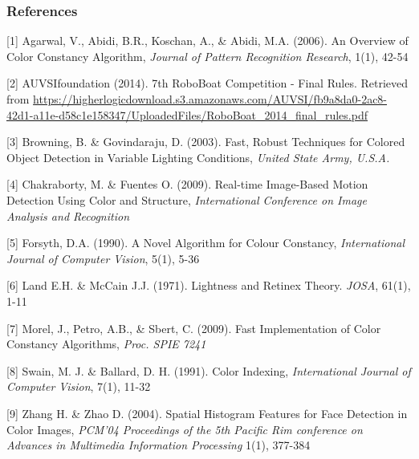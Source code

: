 \documentclass{article} %
\begin{document}
\subsubsection*{References}



\small{

[1]  Agarwal, V., Abidi, B.R., Koschan, A., \& Abidi, M.A. (2006). An Overview of Color Constancy Algorithm, {\it Journal of Pattern Recognition Research}, 1(1), 42-54

[2] AUVSIfoundation (2014). 7th RoboBoat Competition - Final Rules. Retrieved from
\url{https://higherlogicdownload.s3.amazonaws.com/AUVSI/fb9a8da0-2ac8-42d1-a11e-d58c1e158347/UploadedFiles/RoboBoat_2014_final_rules.pdf}

[3] Browning, B. \& Govindaraju, D. (2003). Fast, Robust Techniques for Colored Object Detection in Variable Lighting Conditions, {\it United State Army, U.S.A.}

[4] Chakraborty, M. \& Fuentes O. (2009). Real-time Image-Based Motion Detection Using Color and Structure, {\it International Conference on Image Analysis and Recognition}

[5] Forsyth, D.A. (1990). A Novel Algorithm for Colour Constancy, {\it International Journal of Computer Vision}, 5(1), 5-36

[6] Land E.H. \& McCain J.J. (1971). Lightness and Retinex Theory. {\it JOSA}, 61(1), 1-11

[7] Morel, J., Petro, A.B., \& Sbert, C. (2009). Fast Implementation of Color Constancy Algorithms, {\it Proc. SPIE 7241}

[8] Swain, M. J. \& Ballard, D. H. (1991). Color Indexing, {\it International Journal of Computer Vision}, 7(1), 11-32

[9] Zhang H. \& Zhao D. (2004). Spatial Histogram Features for Face Detection in Color Images, {\it PCM'04 Proceedings of the 5th Pacific Rim conference on Advances in Multimedia Information Processing} 1(1), 377-384 



}
\end{document}
